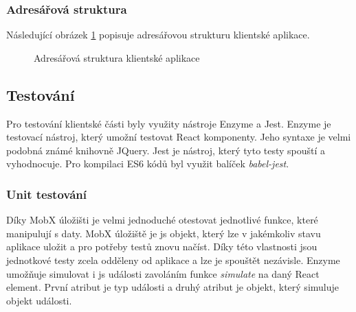 \documentclass[a4paper,11pt,titlepage,fleqn]{article}
\begin{document}
        \subsubsection{Adresářová struktura}
        Následující obrázek \ref{dir-structure-client} popisuje adresářovou strukturu klientské aplikace.

            \begin{figure}[ht!]
                \caption{Adresářová struktura klientské aplikace}
                \label{dir-structure-client}
            \end{figure}

    \subsection{Testování}
        Pro testování klientské části byly využity nástroje Enzyme a Jest. Enzyme je testovací nástroj, který umožní testovat React komponenty. Jeho syntaxe je velmi podobná známé knihovně JQuery. Jest je nástroj, který tyto testy spouští a vyhodnocuje. Pro kompilaci ES6 kódů byl využit balíček \textit{babel-jest}. 

        \subsubsection{Unit testování}
            Díky MobX úložišti je velmi jednoduché otestovat jednotlivé funkce, které manipulují s daty. MobX úložiště je \gls{js} objekt, který lze v jakémkoliv stavu aplikace uložit a pro potřeby testů znovu načíst. Díky této vlastnosti jsou jednotkové testy zcela odděleny od aplikace a lze je spouštět nezávisle. Enzyme umožňuje simulovat i \gls{js} události zavoláním funkce \textit{simulate} na daný React element. První atribut je typ události a druhý atribut je objekt, který simuluje objekt události.
\end{document}
